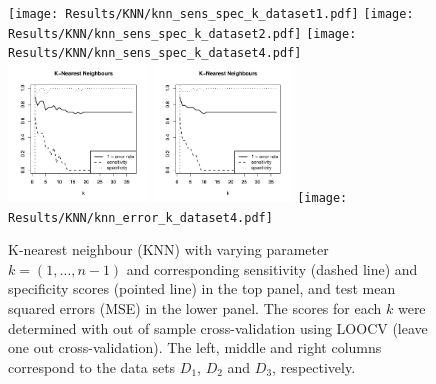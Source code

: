 \documentclass{article}
\begin{document}
\begin{figure}
   \hspace{-3mm}\texttt{[image: Results/KNN/knn\_sens\_spec\_k\_dataset1.pdf]}\hspace{-3mm}
  \texttt{[image: Results/KNN/knn\_sens\_spec\_k\_dataset2.pdf]}\hspace{-3mm}
  \texttt{[image: Results/KNN/knn\_sens\_spec\_k\_dataset4.pdf]}  \\
   \hspace{-3mm}\includegraphics[width=0.33\textwidth]{Results/KNN/knn_error_k_dataset1.pdf}\hspace{-3mm}
  \includegraphics[width=0.33\textwidth]{Results/KNN/knn_error_k_dataset2.pdf}\hspace{-3mm}
  \texttt{[image: Results/KNN/knn\_error\_k\_dataset4.pdf]}  \\
  \caption{\label{fig:knn_k}
K-nearest neighbour (KNN) with varying parameter $k = (1,\dots,n-1)$ and corresponding sensitivity (dashed line) and specificity scores (pointed line) in the top panel, and test mean squared errors (MSE) in the lower panel. The scores for each $k$ were determined with out of sample cross-validation using LOOCV (leave one out cross-validation). The left, middle and right columns correspond to the data sets $D_1$, $D_2$ and $D_3$, respectively. }
\end{figure}
\end{document}
